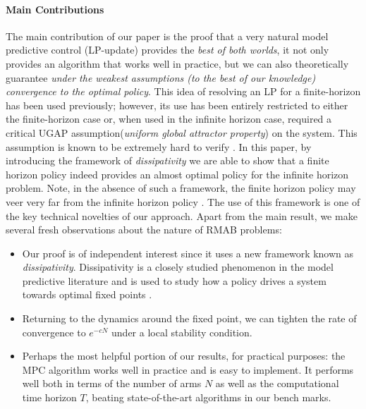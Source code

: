 \paragraph{Main Contributions}
The main contribution of our paper is the proof that a very natural model predictive control (LP-update) provides the \emph{best of both worlds}, it not only provides an algorithm that works well in practice, but we can also theoretically guarantee \emph{under the weakest assumptions (to the best of our knowledge) convergence to the optimal policy}. This idea of resolving an LP for a finite-horizon has been used previously; however, its use has been entirely restricted to either the finite-horizon case or, when used in the infinite horizon case, required a critical UGAP assumption(\emph{uniform global attractor property}) on the system. This assumption is known to be extremely hard to verify \cite{GGY23}. In this paper, by introducing the framework of \emph{dissipativity} we are able to show that a finite horizon policy indeed provides an almost optimal policy for the infinite horizon problem. Note, in the absence of such a framework, the finite horizon policy may veer very far from the infinite horizon policy \cite{DTGLS14}. The use of this framework is one of the key technical novelties of our approach. 
Apart from the main result, we make several fresh observations about the nature of RMAB problems:
\begin{itemize}[nosep]
    \item Our proof is of independent interest since it uses a new framework known as \emph{dissipativity}. Dissipativity is a closely studied phenomenon in the model predictive literature and is used to study how a policy drives a system towards optimal fixed points \citet{DTGLS14}. 
    \item Returning to the dynamics around the fixed point, we can tighten the rate of convergence to $e^{-cN}$ under a local stability condition.
    
    \item Perhaps the most helpful portion of our results, for practical purposes: the MPC algorithm works well in practice and is easy to implement. It performs well both in terms of the number of arms $N$ as well as the computational time horizon $T$, beating state-of-the-art algorithms in our bench marks. 
\end{itemize}

